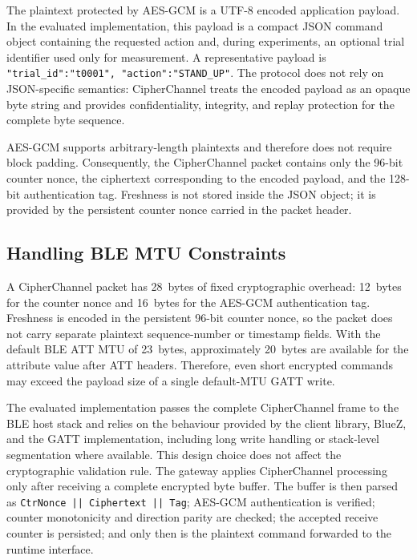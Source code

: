 \documentclass[journal]{IEEEtran}
\begin{document}
The plaintext protected by AES-GCM is a UTF-8 encoded application payload. In the evaluated implementation, this payload is a compact JSON command object containing the requested action and, during experiments, an optional trial identifier used only for measurement. A representative payload is \texttt{{"trial\_id":"t0001", "action":"STAND\_UP"}}. The protocol does not rely on JSON-specific semantics: CipherChannel treats the encoded payload as an opaque byte string and provides confidentiality, integrity, and replay protection for the complete byte sequence.

AES-GCM supports arbitrary-length plaintexts and therefore does not require block padding. Consequently, the CipherChannel packet contains only the 96-bit counter nonce, the ciphertext corresponding to the encoded payload, and the 128-bit authentication tag. Freshness is not stored inside the JSON object; it is provided by the persistent counter nonce carried in the packet header.


\subsection{Handling BLE MTU Constraints}
\label{sec:mtu}

A CipherChannel packet has 28~bytes of fixed cryptographic overhead: 12~bytes for the counter nonce and 16~bytes for the AES-GCM authentication tag. Freshness is encoded in the persistent 96-bit counter nonce, so the packet does not carry separate plaintext sequence-number or timestamp fields. With the default BLE ATT MTU of 23~bytes, approximately 20~bytes are available for the attribute value after ATT headers. Therefore, even short encrypted commands may exceed the payload size of a single default-MTU GATT write.

The evaluated implementation passes the complete CipherChannel frame to the BLE host stack and relies on the behaviour provided by the client library, BlueZ, and the GATT implementation, including long write handling or stack-level segmentation where available. This design choice does not affect the cryptographic validation rule. The gateway applies CipherChannel processing only after receiving a complete encrypted byte buffer. The buffer is then parsed as \texttt{CtrNonce || Ciphertext || Tag}; AES-GCM authentication is verified; counter monotonicity and direction parity are checked; the accepted receive counter is persisted; and only then is the plaintext command forwarded to the runtime interface.
\end{document}
